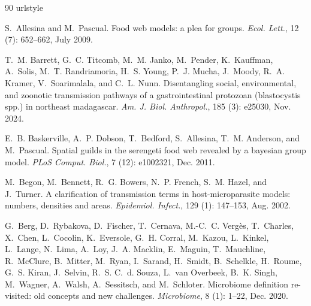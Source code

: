 \documentclass[oneside, a4paper, onecolumn, 11pt]{article}
\begin{document}
\begin{thebibliography}{90}
\providecommand{\natexlab}[1]{#1}
\providecommand{\url}[1]{\texttt{#1}}
\expandafter\ifx\csname urlstyle\endcsname\relax
  \providecommand{\doi}[1]{doi: #1}\else
  \providecommand{\doi}{doi: \begingroup \urlstyle{rm}\Url}\fi

S.~Allesina and M.~Pascual.
\newblock Food web models: a plea for groups.
\newblock \emph{Ecol. Lett.}, 12 (7): 652--662, July 2009.

T.~M. Barrett, G.~C. Titcomb, M.~M. Janko, M.~Pender, K.~Kauffman, A.~Solis, M.~T. Randriamoria, H.~S. Young, P.~J. Mucha, J.~Moody, R.~A. Kramer, V.~Soarimalala, and C.~L. Nunn.
\newblock Disentangling social, environmental, and zoonotic transmission pathways of a gastrointestinal protozoan (blastocystis spp.) in northeast madagascar.
\newblock \emph{Am. J. Biol. Anthropol.}, 185 (3): e25030, Nov. 2024.

E.~B. Baskerville, A.~P. Dobson, T.~Bedford, S.~Allesina, T.~M. Anderson, and M.~Pascual.
\newblock Spatial guilds in the serengeti food web revealed by a bayesian group model.
\newblock \emph{PLoS Comput. Biol.}, 7 (12): e1002321, Dec. 2011.

M.~Begon, M.~Bennett, R.~G. Bowers, N.~P. French, S.~M. Hazel, and J.~Turner.
\newblock A clarification of transmission terms in host-microparasite models: numbers, densities and areas.
\newblock \emph{Epidemiol. Infect.}, 129 (1): 147--153, Aug. 2002.

G.~Berg, D.~Rybakova, D.~Fischer, T.~Cernava, M.-C.~C. Vergès, T.~Charles, X.~Chen, L.~Cocolin, K.~Eversole, G.~H. Corral, M.~Kazou, L.~Kinkel, L.~Lange, N.~Lima, A.~Loy, J.~A. Macklin, E.~Maguin, T.~Mauchline, R.~McClure, B.~Mitter, M.~Ryan, I.~Sarand, H.~Smidt, B.~Schelkle, H.~Roume, G.~S. Kiran, J.~Selvin, R.~S. C.~d. Souza, L.~van Overbeek, B.~K. Singh, M.~Wagner, A.~Walsh, A.~Sessitsch, and M.~Schloter.
\newblock Microbiome definition re-visited: old concepts and new challenges.
\newblock \emph{Microbiome}, 8 (1): 1--22, Dec. 2020.


\end{thebibliography}
\end{document}
